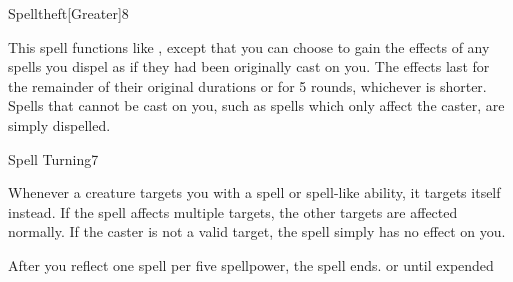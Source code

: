 \begin{spellsection}{Spelltheft}[Greater]{8}
    \begin{spellheader}
    \end{spellheader}
    \begin{spellcontent}
        \spellspecial This spell functions like , except that you can choose to gain the effects of any spells you dispel as if they had been originally cast on you. The effects last for the remainder of their original durations or for 5 rounds, whichever is shorter. Spells that cannot be cast on you, such as spells which only affect the caster, are simply dispelled.
    \end{spellcontent}
    \begin{spellfooter}
        \miscastyou
    \end{spellfooter}
\end{spellsection}

\begin{spellsection}{Spell Turning}{7}
    \begin{spellheader}
    \end{spellheader}
    \begin{spellcontent}
        \begin{spelltargetinginfo}
        \end{spelltargetinginfo}
        \begin{spelleffects}
            \spelleffect Whenever a creature targets you with a spell or spell-like ability, it targets itself instead. If the spell affects multiple targets, the other targets are affected normally. If the caster is not a valid target, the spell simply has no effect on you.

            After you reflect one spell per five spellpower, the spell ends.
            \spelldur \durlong or until expended
        \end{spelleffects}
    \end{spellcontent}
    \begin{spellfooter}
        \miscastexplode
    \end{spellfooter}
\end{spellsection}

